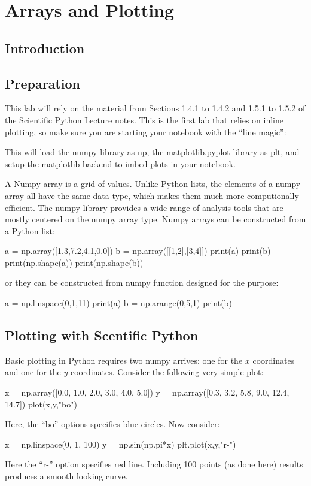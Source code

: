 \chapter{Arrays and Plotting}

\section{Introduction}

\section{Preparation}

This lab will rely on the material from Sections 1.4.1 to 1.4.2 and
1.5.1 to 1.5.2 of the Scientific Python Lecture notes.  This is the
first lab that relies on inline plotting, so make sure you are
starting your notebook with the ``line magic'':
\begin{python}
\end{python}
This will load the numpy library as np, the matplotlib.pyplot library
as plt, and setup the matplotlib backend to imbed plots in your
notebook.

A Numpy array is a grid of values.  Unlike Python lists, the elements
of a numpy array all have the same data type, which makes them much
more computionally efficient.  The numpy library provides a wide range
of analysis tools that are mostly centered on the numpy array type.
Numpy arrays can be constructed from a Python list:
\begin{python}
a = np.array([1.3,7.2,4.1,0.0])
b = np.array([[1,2],[3,4]])
print(a)
print(b)
print(np.shape(a))
print(np.shape(b))
\end{python}
or they can be constructed from numpy function designed for the purpose:
\begin{python}
a = np.linspace(0,1,11)
print(a)
b = np.arange(0,5,1)
print(b)
\end{python}

\section{Plotting with Scentific Python}

Basic plotting in Python requires two numpy arrives: one for the $x$
coordinates and one for the $y$ coordinates.  Consider the following
very simple plot:
\begin{python}
x = np.array([0.0, 1.0, 2.0, 3.0, 4.0,  5.0])
y = np.array([0.3, 3.2, 5.8, 9.0, 12.4, 14.7])
plot(x,y,"bo")
\end{python}
Here, the ``bo'' options specifies blue circles.  Now consider:
\begin{python}
x = np.linspace(0, 1, 100)
y = np.sin(np.pi*x)
plt.plot(x,y,"r-")
\end{python}
Here the ``r-'' option specifies red line.  Including 100 points (as
done here) results produces a smooth looking curve.

